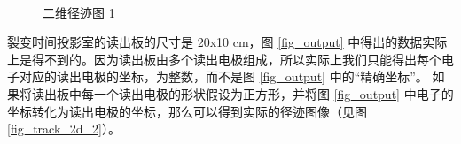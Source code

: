 \documentclass[AutoFakeBold]{LZUThesis}
\begin{document}
\begin{figure}[H]
	\centering
	\\	
    \caption{二维径迹图 1}
    \label{fig_track_2d_1}
\end{figure}

裂变时间投影室的读出板的尺寸是 20x10 cm，图 \ref{fig_output} 中得出的数据实际上是得不到的。因为读出板由多个读出电极组成，所以实际上我们只能得出每个电子对应的读出电极的坐标，为整数，而不是图 \ref{fig_output} 中的“精确坐标”。
如果将读出板中每一个读出电极的形状假设为正方形，并将图 \ref{fig_output} 中电子的坐标转化为读出电极的坐标，那么可以得到实际的径迹图像（见图 \ref{fig_track_2d_2}）。
\end{document}
